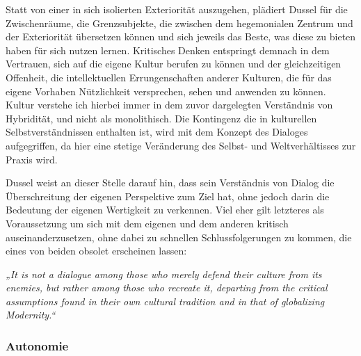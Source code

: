 Statt von einer in sich isolierten Exteriorität auszugehen, plädiert Dussel für
die Zwischenräume, die Grenzsubjekte, die zwischen dem hegemonialen Zentrum und
der Exteriorität übersetzen können und sich jeweils das Beste, was diese zu
bieten haben für sich nutzen lernen. Kritisches Denken entspringt demnach in dem
Vertrauen, sich auf die eigene Kultur berufen zu können und der gleichzeitigen
Offenheit, die intellektuellen Errungenschaften anderer Kulturen, die für das
eigene Vorhaben Nützlichkeit versprechen, sehen und anwenden zu
können.\footnotemark {}\\
 Kultur verstehe ich hierbei immer
in dem zuvor dargelegten Verständnis von Hybridität, und nicht als monolithisch.
Die Kontingenz die in kulturellen Selbstverständnissen enthalten ist, wird mit
dem Konzept des Dialoges aufgegriffen, da hier eine stetige Veränderung des
Selbst- und Weltverhältisses zur Praxis wird.

Dussel weist an dieser Stelle darauf hin, dass sein Verständnis von Dialog die
Überschreitung der eigenen Perspektive zum Ziel hat, ohne jedoch darin die
Bedeutung der eigenen Wertigkeit zu verkennen. Viel eher gilt letzteres als
Voraussetzung um sich mit dem eigenen und dem anderen kritisch
auseinanderzusetzen, ohne dabei zu schnellen Schlussfolgerungen zu kommen, die
eines von beiden obsolet erscheinen lassen:
\begin{myenv}
    \textit{„It is not a dialogue among those who merely defend their culture
    from its enemies, but rather among those who recreate it, departing from the
    critical assumptions found in their own cultural tradition and in that of
    globalizing Modernity.“\footnotemark {}}
\end{myenv}

\subsubsection{Autonomie}

